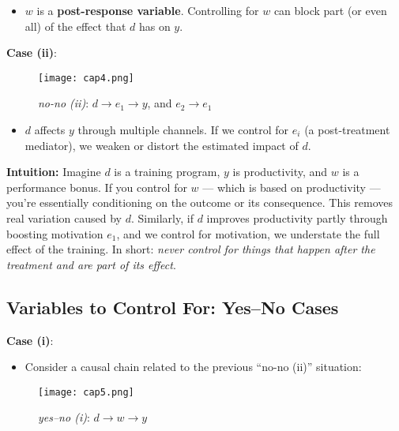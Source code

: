 \documentclass[12pt]{article}
\begin{document}
\begin{itemize}
  \item $w$ is a \textbf{post-response variable}. Controlling for $w$ can block part (or even all) of the effect that $d$ has on $y$.
\end{itemize}

\vspace{1em}

\textbf{Case (ii)}:

\begin{figure}[H]
  \centering
  \texttt{[image: cap4.png]} %
  \caption*{\textit{no-no (ii)}: $d \rightarrow e_1 \rightarrow y$, and $e_2 \rightarrow e_1$}
\end{figure}

\begin{itemize}
  \item $d$ affects $y$ through multiple channels. If we control for $e_i$ (a post-treatment mediator), we weaken or distort the estimated impact of $d$.
\end{itemize}

\textbf{Intuition:}  
Imagine $d$ is a training program, $y$ is productivity, and $w$ is a performance bonus. If you control for $w$ — which is based on productivity — you’re essentially conditioning on the outcome or its consequence. This removes real variation caused by $d$. Similarly, if $d$ improves productivity partly through boosting motivation $e_1$, and we control for motivation, we understate the full effect of the training. In short: \textit{never control for things that happen after the treatment and are part of its effect}.

\subsection*{\noindent\textbf{Variables to Control For: Yes–No Cases}}

\textbf{Case (i)}:

\begin{itemize}
  \item Consider a causal chain related to the previous “no-no (ii)” situation:
\end{itemize}

\begin{figure}[H]
  \centering
  \texttt{[image: cap5.png]} %
  \caption*{\textit{yes–no (i)}: $d \rightarrow w \rightarrow y$}
\end{figure}
\end{document}
